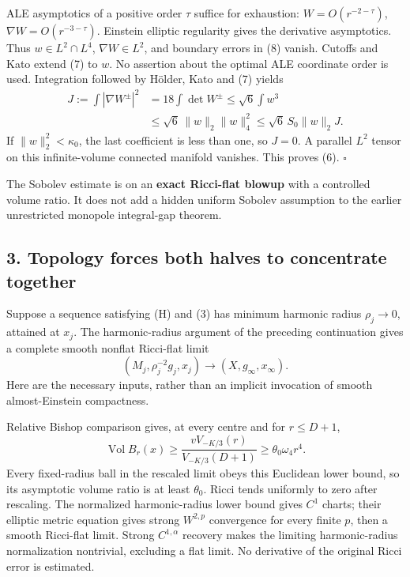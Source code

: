 \documentclass[
  11pt,
]{article}
\begin{document}
ALE asymptotics of a positive order \(\tau\) suffice for exhaustion:
\(W=O(r^{-2-\tau})\), \(\nabla W=O(r^{-3-\tau})\). Einstein elliptic
regularity gives the derivative asymptotics. Thus \(w\in L^2\cap L^4\),
\(\nabla W\in L^2\), and boundary errors in (8) vanish. Cutoffs and Kato
extend (7) to \(w\). No assertion about the optimal ALE coordinate order
is used. Integration followed by Hölder, Kato and (7) yields \[
 \begin{aligned}
 J:=\int|\nabla W^\pm|^2
 &=18\int\det W^\pm
 \le\sqrt6\int w^3\\
 &\le\sqrt6\,\|w\|_2\|w\|_4^2
 \le\sqrt6\,S_0\|w\|_2J.
 \end{aligned}                                          \tag{10}
\] If \(\|w\|_2^2<\kappa_0\), the last coefficient is less than one, so
\(J=0\). A parallel \(L^2\) tensor on this infinite-volume connected
manifold vanishes. This proves (6). \(\square\)

The Sobolev estimate is on an \textbf{exact Ricci-flat blowup} with a
controlled volume ratio. It does not add a hidden uniform Sobolev
assumption to the earlier unrestricted monopole integral-gap theorem.

\hypertarget{topology-forces-both-halves-to-concentrate-together}{%
\subsection{3. Topology forces both halves to concentrate
together}\label{topology-forces-both-halves-to-concentrate-together}}

Suppose a sequence satisfying (H) and (3) has minimum harmonic radius
\(\rho_j\to0\), attained at \(x_j\). The harmonic-radius argument of the
preceding continuation gives a complete smooth nonflat Ricci-flat limit
\[
 (M_j,\rho_j^{-2}g_j,x_j)\longrightarrow
                  (X,g_\infty,x_\infty).                 \tag{11}
\] Here are the necessary inputs, rather than an implicit invocation of
smooth almost-Einstein compactness.

Relative Bishop comparison gives, at every centre and for \(r\le D+1\),
\[
 \operatorname{Vol}B_r(x)
 \ge \frac{vV_{-K/3}(r)}{V_{-K/3}(D+1)}
 \ge\theta_0\omega_4r^4.                                 \tag{12}
\] Every fixed-radius ball in the rescaled limit obeys this Euclidean
lower bound, so its asymptotic volume ratio is at least \(\theta_0\).
Ricci tends uniformly to zero after rescaling. The normalized
harmonic-radius lower bound gives \(C^1\) charts; their elliptic metric
equation gives strong \(W^{2,p}\) convergence for every finite \(p\),
then a smooth Ricci-flat limit. Strong \(C^{1,\alpha}\) recovery makes
the limiting harmonic-radius normalization nontrivial, excluding a flat
limit. No derivative of the original Ricci error is estimated.
\end{document}
